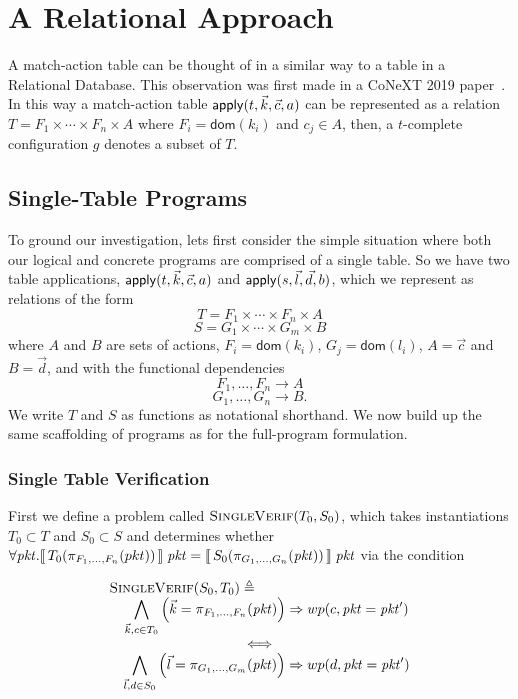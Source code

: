 \section{A Relational Approach}

A match-action table can be thought of in a similar way to a table in
a Relational Database. This observation was first made in a CoNeXT
2019 paper~\cite{Chiesa}. In this way a match-action table
$\mathsf{apply}(t, \vec k, \vec c, a)$ can be represented as a relation
$T = F_1 \times \cdots \times F_n \times A$ where
$F_i = \mathsf{dom}(k_i)$ and $c_j \in A$, then, a $t$-complete
configuration $g$ denotes a subset of $T$.

\subsection{Single-Table Programs}

To ground our investigation, lets first consider the simple situation
where both our logical and concrete programs are comprised of a single
table. So we have two table applications,
$\mathsf{apply}(t,\vec k, \vec c, a)$ and $\mathsf{apply}(s, \vec l, \vec d, b)$,
which we represent as relations of the form
\[T = F_1 \times \cdots \times F_n \times A\]
\[S = G_1 \times \cdots \times G_m \times B\] where $A$ and $B$ are
sets of actions, $F_i = \mathsf{dom}(k_i)$, $G_j = \mathsf{dom}(l_i)$,
$A = \vec c$ and $B = \vec d$, and with the functional dependencies
\[F_1, \ldots, F_n \to A\] \[G_1, \ldots, G_n \to B.\] We write $T$
and $S$ as functions as notational shorthand. We now build up the same
scaffolding of programs as for the full-program formulation.

\subsubsection{Single Table Verification}
First we define a problem called $\textsc{SingleVerif}(T_0, S_0)$,
which takes instantiations $T_0 \subset T$ and $S_0 \subset S$ and
determines whether
$\forall \mathit{pkt}. \llbracket\,T_0(\pi_{F_1,\ldots,F_n}(pkt))\,\rrbracket\;\mathit{pkt} =
\llbracket\,S_0(\pi_{G_1,\ldots,G_n}(\mathit{pkt}))\,\rrbracket\; \mathit{pkt}$ via the condition

\[\begin{array}c
    \multicolumn{1}{l}{\textsc{SingleVerif}(S_0,T_0) \triangleq}\\
    \displaystyle \quad \bigwedge_{\vec k, c \in T_0}\left(\vec k = \pi_{F_1,\ldots,F_n}(\pkt)\right) \Rightarrow wp(c,\pkt= \pkt')\\ \iff \\
    \displaystyle \quad \bigwedge_{\vec l, d \in S_0}\left(\vec l = \pi_{G_1,\ldots,G_m}(\pkt)\right) \Rightarrow wp(d, \pkt= \pkt')
  \end{array}
\]

